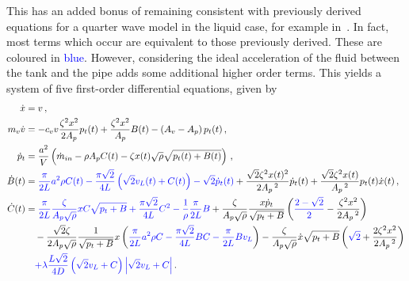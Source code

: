 This has an added bonus of remaining consistent with previously derived equations for a quarter wave model in the liquid case, for example in~\cite{Hos2015ModelPipe}. In fact, most terms which occur are equivalent to those previously derived. These are coloured in \textcolor{Blue}{blue}. However, considering the ideal acceleration of the fluid between the tank and the pipe adds some additional higher order terms. This yields a system of five first-order differential equations, given by
~
\begin{equation}
\begin{split}
    \dot{x} &= v \, , \\
    m_v \dot{v} &= - c_v v \frac{\zeta^2 x^2}{2 A_p} p_t(t) + \frac{\zeta^2 x^2}{A_p} B(t) - \left( A_v - A_p \right) p_t(t)
    \, , \\
    \dot{p}_t &= \frac{a^2}{V} \left( \dot{m}_{in} - \rho A_p C(t) - \zeta x(t) \sqrt{\rho} \sqrt{p_t(t) + B(t)} \right)
    \, , \\
    \dot{B}(t) &= \textcolor{Blue}{
    \frac{\pi}{2L} a^2 \rho C(t) - \frac{\pi \sqrt{2}}{4L} \left( \sqrt{2} v_L(t) + C(t) \right) - \sqrt{2} \dot{p}_t(t)} + \frac{\sqrt{2} \zeta^2 x(t)^2}{2 A_p\,^2} \dot{p}_t(t) + \frac{\sqrt{2} \zeta^2 x(t)}{A_p\,^2} p_t(t) \dot{x}(t)
    \, , \\
    \dot{C}(t) &=
    \textcolor{Blue}{
    \frac{\pi}{2L} \frac{\zeta}{A_p \sqrt{\rho}} x C \sqrt{p_t + B}
    + \frac{\pi \sqrt{2}}{4 L} C^2
    - \frac{1}{\rho} \frac{\pi}{2L} B
    }
    + \frac{\zeta}{A_p \sqrt{\rho}} \frac{x \dot{p}_t}{\sqrt{p_t+B}} \left( 
    \textcolor{Blue}{\frac{2 - \sqrt{2}}{2}} -
    \frac{\zeta^2 x^2}{2 A_p\,^2} \right)
    \\ & \quad %
    - \frac{\sqrt{2} \zeta}{2 A_p \sqrt{\rho}} \frac{1}{\sqrt{p_t+B}} x \left(
    \textcolor{Blue}{
    \frac{\pi}{2L} a^2 \rho C
    - \frac{\pi \sqrt{2}}{4 L} B C
    - \frac{\pi}{2L} B v_L }
    \right)
    - \frac{\zeta}{A_p \sqrt{\rho}} \dot{x} \sqrt{p_t + B} \left( 
    \textcolor{Blue}{\sqrt{2}} +
    \frac{2 \zeta^2 x^2}{2 A_p\,^2}
    \right)
    \\ & \quad %
    \textcolor{Blue}{
    + \lambda \frac{L \sqrt{2}}{4 D} \left( \sqrt{2} v_L + C \right) \left| \sqrt{2} v_L + C \right| }
    \, .
\end{split}
\end{equation}

